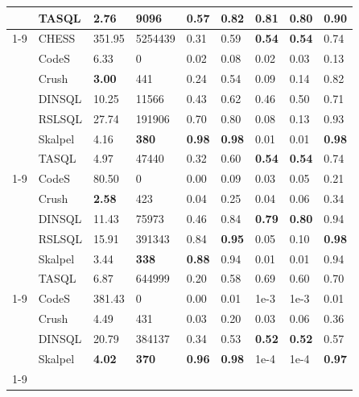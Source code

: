 \begin{table}
\begin{tabular}{lllllllll}
 & TASQL & 2.76 & 9096 & 0.57 & 0.82 & \textbf{0.81} & \textbf{0.80} & 0.90 \\
\cline{1-9}
\multirow[t]{7}{*}{L} & CHESS & 351.95 & 5254439 & 0.31 & 0.59 & \textbf{0.54} & \textbf{0.54} & 0.74 \\
 & CodeS & 6.33 & 0 & 0.02 & 0.08 & 0.02 & 0.03 & 0.13 \\
 & Crush & \textbf{3.00} & 441 & 0.24 & 0.54 & 0.09 & 0.14 & 0.82 \\
 & DINSQL & 10.25 & 11566 & 0.43 & 0.62 & 0.46 & 0.50 & 0.71 \\
 & RSLSQL & 27.74 & 191906 & 0.70 & 0.80 & 0.08 & 0.13 & 0.93 \\
 & Skalpel & 4.16 & \textbf{380} & \textbf{0.98} & \textbf{0.98} & 0.01 & 0.01 & \textbf{0.98} \\
 & TASQL & 4.97 & 47440 & 0.32 & 0.60 & \textbf{0.54} & \textbf{0.54} & 0.74 \\
\cline{1-9}
\multirow[t]{6}{*}{XL} & CodeS & 80.50 & 0 & 0.00 & 0.09 & 0.03 & 0.05 & 0.21 \\
 & Crush & \textbf{2.58} & 423 & 0.04 & 0.25 & 0.04 & 0.06 & 0.34 \\
 & DINSQL & 11.43 & 75973 & 0.46 & 0.84 & \textbf{0.79} & \textbf{0.80} & 0.94 \\
 & RSLSQL & 15.91 & 391343 & 0.84 & \textbf{0.95} & 0.05 & 0.10 & \textbf{0.98} \\
 & Skalpel & 3.44 & \textbf{338} & \textbf{0.88} & 0.94 & 0.01 & 0.01 & 0.94 \\
 & TASQL & 6.87 & 644999 & 0.20 & 0.58 & 0.69 & 0.60 & 0.70 \\
\cline{1-9}
\multirow[t]{4}{*}{XXL} & CodeS & 381.43 & 0 & 0.00 & 0.01 & 1e-3 & 1e-3 & 0.01 \\
 & Crush & 4.49 & 431 & 0.03 & 0.20 & 0.03 & 0.06 & 0.36 \\
 & DINSQL & 20.79 & 384137 & 0.34 & 0.53 & \textbf{0.52} & \textbf{0.52} & 0.57 \\
 & Skalpel & \textbf{4.02} & \textbf{370} & \textbf{0.96} & \textbf{0.98} & 1e-4 & 1e-4 & \textbf{0.97} \\
\cline{1-9}
\bottomrule
\end{tabular}
\end{table}
